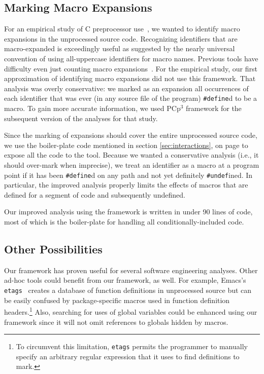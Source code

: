 \documentclass{article}
\newcommand{\pcp}{\mbox{\textsf{PCp}$^3$}}
\newcommand{\C}{\mbox{C}}
\newcommand{\ppd}[1]{\texttt{\##1}}
\newcommand{\sectionref}[1]{section \ref{#1}, on page \pageref{#1}}
\newcommand{\ie}{i.e.,}
\begin{document}
\subsection{Marking Macro Expansions}
\label{ssec:mark_macros}
\nopagebreak

For an empirical study of \C{} preprocessor use~\cite{EmpCpp-TR}, we
wanted to identify macro expansions in the unprocessed source code.
Recognizing identifiers that are macro-expanded is exceedingly useful as
suggested by the nearly universal convention of using all-uppercase
identifiers for macro names.  Previous tools have difficulty even just
counting macro expansions~\cite{Griswold96}.  For the empirical study,
our first approximation of identifying macro expansions did not use this
framework.  That analysis was overly conservative: we marked as an
expansion all occurrences of each identifier that was ever
(in any source file of the program) \ppd{define}d to be a macro.
To gain more accurate information, we used \pcp{}
framework for the subsequent version of the analyses for that study.

Since the marking of expansions should cover the entire unprocessed
source code, we use the boiler-plate code mentioned in \sectionref{sec:interactions}
to expose all the code to the tool.  Because we wanted a
conservative analysis (\ie{} it should over-mark when imprecise), we treat an
identifier as a macro at a program point if it has been \ppd{define}d on
any path and not yet definitely \ppd{undef}ined.  In particular, the
improved analysis properly limits the effects of macros that are
defined for a segment of code and subsequently undefined.

Our improved analysis using the framework is written in under 90 lines
of code, most of which is the boiler-plate for handling all
conditionally-included code.

\subsection{Other Possibilities}
\label{ssec:other_poss}

Our framework has proven useful for several software engineering
analyses.  Other ad-hoc tools could benefit from our framework, as well.
For example, Emacs's \texttt{etags}~\cite{GNUELisp} creates a database
of function definitions in unprocessed source but can be easily confused
by package-specific macros used in function definition headers.\footnote{To
circumvent this limitation, \texttt{etags} permits the programmer to manually specify an
arbitrary regular expression that it uses to find definitions to mark.}
Also, searching for uses of global variables could be enhanced using our
framework since it will not omit references to globals hidden by macros.
\end{document}
